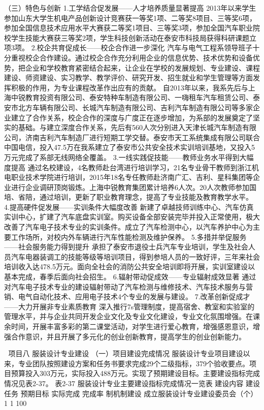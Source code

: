 （三）特色与创新
1.工学结合促发展——人才培养质量显著提高
2013年以来学生参加山东大学生机电产品创新设计竞赛获一等奖1项、二等奖8项目、三等奖6项，参加全国信息技术应用水平大赛获二等奖1项目、三等奖3项，参加全国汽车职业院校学生技能大赛获三等奖2项，学生科技创新活动在泰安市科技局获得科研课题立项3项。
2.校企共育促成长——校企合作进一步深化
汽车与电气工程系领导班子十分重视校企合作建设。通过校企合作充分利用企业的信息优势、技术优势和设备优势，把企业和学校教育紧密结合起来，让企业在学校的发展规划、专业建设、课程建设、师资建设、实习教学、教学评价、研究开发、招生就业和学生管理等方面发挥积极的作用，为专业课程改革作出应有的贡献。
自2013年以来，我系先后与上海中锐教育投资有限公司、泰安特种车制造有限公司、一嗨租车汽车租赁公司、泰安市北方车辆有限公司、长城汽车制造有限公司、吉利汽车制造有限公司等多家企业建立了合作关系，校企合作的深度与广度正在逐步增加，为系部的发展奠定了坚实的基础。与建立深度合作关系，先后有560人次分别进入天津长城汽车制造有限公司，济南吉利汽车制造厂进行短期工学交替。泰安市天工系统集成有限公司联合中国电信，投入47.5万在我系建立了泰安市公共安全技术实训培训基地，又投入5万元完成了系部无线网络全覆盖。
3.一线实践促技能——教师业务水平得到大幅度提高
通过名校建设，4名教师赴台湾进行培训学习，21名专业骨干教师到浙江机电职业技术学院进行培训，2015年18名专任教师赴济南广汇、吉利、星科集团等企业进行企业调研顶岗锻炼。上海中锐教育集团累计培养6人次。20人次教师参加国培、省陪，通过培训，更新了职业教育理念，提高了专业技能及教育教学水平。
4.提高硬件促发展——实训条件大幅度改善
新建了卓越技师训练中心、汽车仿真实训中心，扩建了汽车底盘实训室。购买设备全部安装完毕并投入正常使用，极大改善了汽车电子技术专业的实训条件。成立了汽车检测中心，以汽车养护中心为主要工作场所，对校内外车辆进行汽车性能检测及维护保养。
5.多措并举促服务——社会服务能力得到提升
承担了泰安市退役士兵汽车专业培训，学生及社会人员汽车电器装调工的技能等级等培训项目，得到参培人员的一致好评，三年来社会培训收入达478.5万元。面向全社会的消防公共安全培训即将开展，实训室建设以基本完成，春季后面向社会招生。
6.辐射带动促成效——专业辐射成效显著
通过对汽车电子技术专业的建设辐射带动了汽车检测与维修技术、汽车技术服务与营销、电气自动化技术、应用电子技术4个专业的发展与建设。
7.改革创新促成才——大力开展非专业素质教育
深入推行7s管理制度，提高宿舍、教室和实验室的管理水平，并与企业共同开发企业文化及专业文化建设，专业文化氛围增强。在课余时间，开展丰富多彩的第二课堂活动，对学生进行爱心教育，增强感恩意识，增强合作意识，并且开展了多元化的创业创新教育，提高学生的创业创新能力。



项目八    服装设计专业建设
（一）项目建设完成情况
服装设计专业项目建设以来，专业团队按照建设方案和任务书要求完成29个二级指标，379个验收要点。项目预算投入303万元，实际投入488万元。实现了预期建设目标。主要建设指标完成情况见表2-37。
表2-37   服装设计专业主要建设指标完成情况一览表
建设内容
建设任务
预期目标
实际完成
完成率
制机制建设
成立服装设计专业建设委员会（个）
1
1
100%

